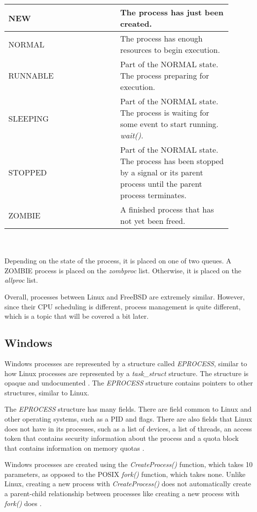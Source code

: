 \documentclass[10pt,draftclsnofoot,onecolumn,journal,compsoc]{IEEEtran}
\begin{document}
\begin{tabular}{ | p{0.45\linewidth} | p{0.45\linewidth} | }
    \hline
    NEW & The process has just been created. \\ \hline
    NORMAL & The process has enough resources to begin execution. \\ \hline
    RUNNABLE & Part of the NORMAL state. The process preparing for execution. \\ \hline
    SLEEPING & Part of the NORMAL state. The process is waiting for some event to start running. \textit{wait()}. \\ \hline
    STOPPED & Part of the NORMAL state. The process has been stopped by a signal or its parent process until the parent process terminates. \\ \hline
    ZOMBIE & A finished process that has not yet been freed. \\ \hline
\end{tabular} \\ \\ 

Depending on the state of the process, it is placed on one of two queues. A ZOMBIE process is placed on the \textit{zombproc} list. Otherwise, it is placed on the \textit{allproc} list. 

Overall, processes between Linux and FreeBSD are extremely similar. However, since their CPU scheduling is different, process management is quite different, which is a topic that will be covered a bit later.


\subsection{Windows}
Windows processes are represented by a structure called \textit{EPROCESS}, similar to how Linux processes are represented by a \textit{task\_struct} structure. The structure is opaque and undocumented \cite{win_proc}. The \textit{EPROCESS} structure contains pointers to other structures, similar to Linux.

The \textit{EPROCESS} structure has many fields. There are field common to Linux and other operating systems, such as a PID and flags. There are also fields that Linux does not have in its processes, such as a list of devices, a list of threads, an access token that contains security information about the process and a quota block that contains information on memory quotas \cite{win_proc2}. 

Windows processes are created using the \textit{CreateProcess()} function, which takes 10 parameters, as opposed to the POSIX \textit{fork()} function, which takes none. Unlike Linux, creating a new process with \textit{CreateProcess()} does not automatically create a parent-child relationship between processes like creating a new process with \textit{fork()} does \cite{win_proc3}. 
\end{document}
